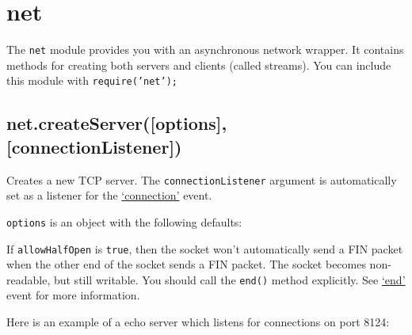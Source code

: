 \section{net}

\begin{Shaded}
\begin{Highlighting}[]
\NormalTok{: } 
\end{Highlighting}
\end{Shaded}

The \texttt{net} module provides you with an asynchronous network
wrapper. It contains methods for creating both servers and clients
(called streams). You can include this module with
\texttt{require('net');}

\subsection{net.createServer({[}options{]}, {[}connectionListener{]})}

Creates a new TCP server. The \texttt{connectionListener} argument is
automatically set as a listener for the
\hyperref[net_event_connection]{`connection'} event.

\texttt{options} is an object with the following defaults:

\begin{Shaded}
\begin{Highlighting}[]
\NormalTok{\{ }\NormalTok{: }
\NormalTok{\}}
\end{Highlighting}
\end{Shaded}

If \texttt{allowHalfOpen} is \texttt{true}, then the socket won't
automatically send a FIN packet when the other end of the socket sends a
FIN packet. The socket becomes non-readable, but still writable. You
should call the \texttt{end()} method explicitly. See
\hyperref[net_event_end]{`end'} event for more information.

Here is an example of a echo server which listens for connections on
port 8124:

